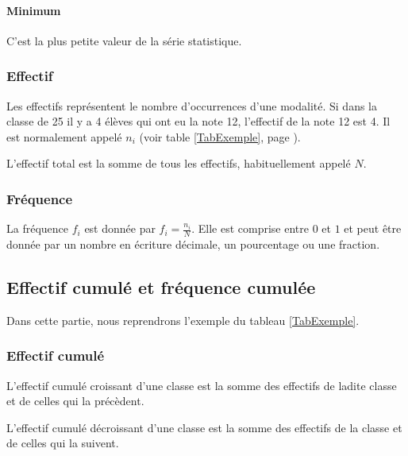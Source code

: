 \documentclass[a4paper,12pt]{scrartcl}
\begin{document}
\paragraph{Minimum}
C'est la plus petite valeur de la série statistique.

\subsubsection{Effectif}

Les effectifs représentent le nombre d'occurrences d'une modalité. Si dans la classe de 25 il y a 4 élèves qui ont eu la note 12, l'effectif de la note 12 est 4. Il est normalement appelé $n_i$ (voir table \ref{TabExemple}, page \pageref{TabExemple}).
  
L'effectif total est la somme de tous les effectifs, habituellement appelé $N$.

\subsubsection{Fréquence}

La fréquence $f_i$ est donnée par $f_i = \frac{n_i}{N}$. Elle est comprise entre $0$ et $1$ et peut être donnée par un nombre en écriture décimale, un pourcentage ou une fraction.


\subsection{Effectif cumulé et fréquence cumulée}

Dans cette partie, nous reprendrons l'exemple du tableau \ref{TabExemple}.

\subsubsection{Effectif cumulé}

L'effectif cumulé croissant d'une classe est la somme des effectifs de ladite classe et de celles qui la précèdent.

L'effectif cumulé décroissant d'une classe est la somme des effectifs de la classe et de celles qui la suivent.
\end{document}

